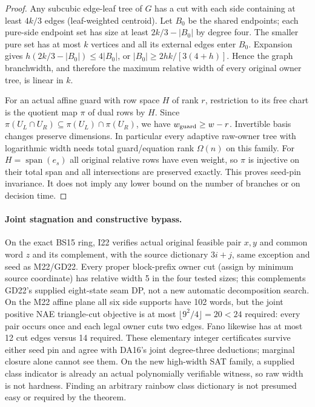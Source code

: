 \documentclass[11pt]{article}
\begin{document}
\begin{proof}
Any subcubic edge-leaf tree of $G$ has a cut with each side containing at least $4k/3$ edges (leaf-weighted centroid). Let $B_0$ be the shared endpoints; each pure-side endpoint set has size at least $2k/3-|B_0|$ by degree four. The smaller pure set has at most $k$ vertices and all its external edges enter $B_0$. Expansion gives $h(2k/3-|B_0|)\le4|B_0|$, or $|B_0|\ge2hk/[3(4+h)]$. Hence the graph branchwidth, and therefore the maximum relative width of every original owner tree, is linear in $k$.

For an actual affine guard with row space $H$ of rank $r$, restriction to its free chart is the quotient map $\pi$ of dual rows by $H$. Since $\pi(U_L\cap U_R)\subseteq\pi(U_L)\cap\pi(U_R)$, we have $w_{\rm guard}\ge w-r$. Invertible basis changes preserve dimensions. In particular every adaptive raw-owner tree with logarithmic width needs total guard/equation rank $\Omega(n)$ on this family. For $H=\operatorname{span}(e_s)$ all original relative rows have even weight, so $\pi$ is injective on their total span and all intersections are preserved exactly. This proves seed-pin invariance. It does not imply any lower bound on the number of branches or on decision time.
\end{proof}

\paragraph{Joint stagnation and constructive bypass.}
On the exact BS15 ring, I22 verifies actual original feasible pair $x,y$ and common word $z$ and its complement, with the source dictionary $3i+j$, same exception and seed as M22/GD22. Every proper block-prefix owner cut (assign by minimum source coordinate) has relative width 5 in the four tested sizes; this complements GD22's supplied eight-state seam DP, not a new automatic decomposition search. On the M22 affine plane all six side supports have 102 words, but the joint positive NAE triangle-cut objective is at most $\lfloor9^2/4\rfloor=20<24$ required: every pair occurs once and each legal owner cuts two edges. Fano likewise has at most 12 cut edges versus 14 required. These elementary integer certificates survive either seed pin and agree with DA16's joint degree-three deductions; marginal closure alone cannot see them. On the new high-width SAT family, a supplied class indicator is already an actual polynomially verifiable witness, so raw width is not hardness. Finding an arbitrary rainbow class dictionary is not presumed easy or required by the theorem.
\end{document}
